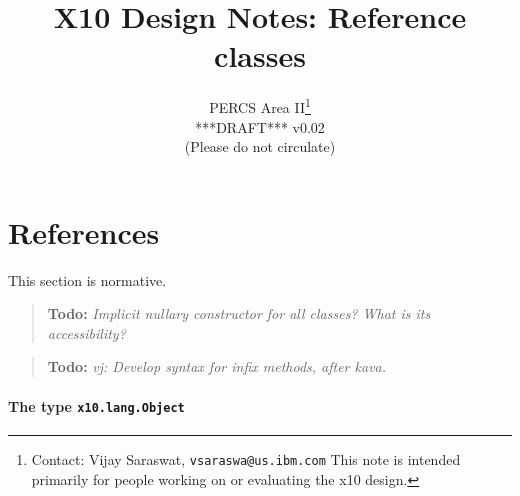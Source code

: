 \documentclass{article}
\def\ccfont{\sf}
\def\x10{{\ccfont x10}}
\def\X10{{\ccfont X10}}
\newcommand \todo[1] {\begin{quotation}{\bf Todo:} {\footnotesize\em #1}\end{quotation}}
\begin{document}
\title{\X10{} Design Notes: Reference classes\\
}
\author{{\sc PERCS} Area II\footnote{Contact: Vijay Saraswat, {\tt vsaraswa@us.ibm.com} This note is intended primarily for people working on or evaluating the \x10{} design.}\\ 
{\sc ****DRAFT*** v0.02}\\ 
(Please do not circulate)
}

\maketitle

\section{References} 
This section is normative.

\todo{Implicit nullary constructor for all classes? What is its
accessibility?}


\todo{vj: Develop syntax for infix methods, after {\sc kava}.}


\paragraph{The type {\tt x10.lang.Object}}
\end{document}
